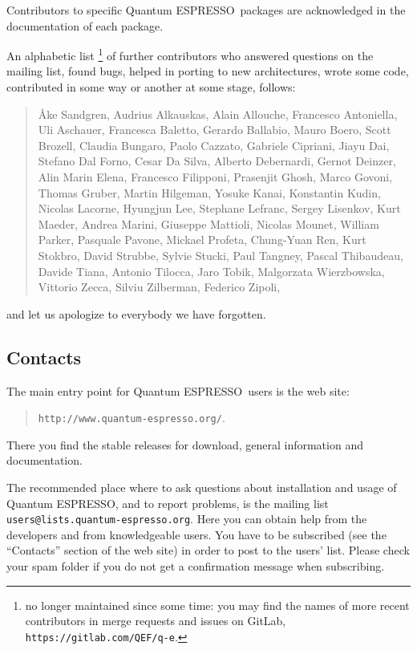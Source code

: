 \documentclass[12pt,a4paper]{article}
\def\qe{{\sc Quantum ESPRESSO}}
\begin{document}
Contributors to specific \qe\ packages are acknowledged in the
documentation of each package.

An alphabetic list \footnote{no longer maintained since some time: 
you may find the names of more recent contributors in merge requests 
and issues on GitLab, \texttt{https://gitlab.com/QEF/q-e}.}
of further contributors who answered questions on the mailing list, found
bugs, helped in porting to new architectures, wrote some code,
contributed in some way or another at some stage, follows:
\begin{quote}
  {\AA}ke Sandgren, Audrius Alkauskas, Alain Allouche, Francesco Antoniella,
  Uli Aschauer, Francesca Baletto, Gerardo Ballabio, Mauro Boero,
  Scott Brozell, Claudia Bungaro, Paolo Cazzato, Gabriele Cipriani,
  Jiayu Dai, Stefano Dal Forno, Cesar Da Silva, Alberto Debernardi,
  Gernot Deinzer, Alin Marin Elena, Francesco Filipponi, Prasenjit Ghosh,
  Marco Govoni, Thomas Gruber, Martin Hilgeman, Yosuke Kanai, Konstantin Kudin,
  Nicolas Lacorne, Hyungjun Lee, Stephane Lefranc, Sergey Lisenkov, Kurt Maeder,
  Andrea Marini, Giuseppe Mattioli, Nicolas Mounet, William Parker,
  Pasquale Pavone, Mickael Profeta, Chung-Yuan Ren,
  Kurt Stokbro, David Strubbe, Sylvie Stucki, Paul Tangney, Pascal Thibaudeau,
  Davide Tiana, Antonio Tilocca, Jaro Tobik, Malgorzata Wierzbowska,
  Vittorio Zecca, Silviu Zilberman, Federico Zipoli,
\end{quote}
and let us apologize to everybody we have forgotten.

\subsection{Contacts}
\label{SubSec:Contacts}

The main entry point for \qe\ users is the web site:
\begin{quote}
\texttt{http://www.quantum-espresso.org/}. 
\end{quote}
There you find
the stable releases for download, general information and
documentation.

The recommended place where to ask questions about installation
and usage of \qe, and to report problems, is the
mailing list \texttt{users@lists.quantum-espresso.org}.
Here you can obtain help from the developers and from
knowledgeable users. You have to be subscribed (see the ``Contacts''
section of the web site) in order to post to the  users' list.
Please check your spam folder if you do not get a confirmation
message when subscribing.
\end{document}
